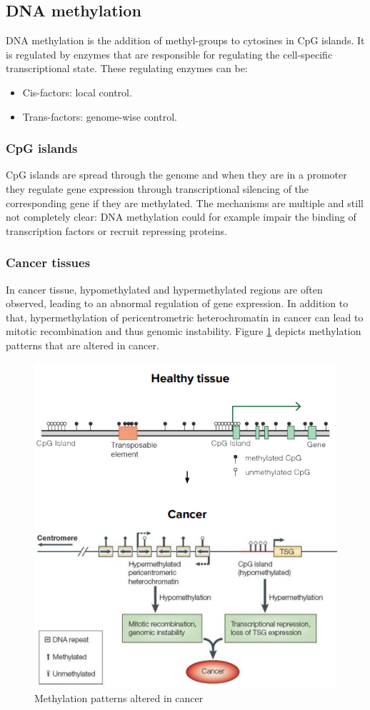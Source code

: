     \subsection{DNA methylation}
    DNA methylation is the addition of methyl-groups to cytosines in CpG islands.
    It is regulated by enzymes that are responsible for regulating the cell-specific transcriptional state.
    These regulating enzymes can be:

    \begin{multicols}{2}
        \begin{itemize}
            \item Cis-factors: local control.
            \item Trans-factors: genome-wise control.
        \end{itemize}
    \end{multicols}



        \subsubsection{CpG islands}
        CpG islands are spread through the genome and when they are in a promoter they regulate gene expression through transcriptional silencing of the corresponding gene if they are methylated.
        The mechanisms are multiple and still not completely clear: DNA methylation could for example impair the binding of transcription factors or recruit repressing proteins.

        \subsubsection{Cancer tissues}
        In cancer tissue, hypomethylated and hypermethylated regions are often observed, leading to an abnormal regulation of gene expression.
        In addition to that, hypermethylation of pericentrometric heterochromatin in cancer can lead to mitotic recombination and thus genomic instability.
        Figure \ref{fig:met-cancer} depicts methylation patterns that are altered in cancer.

        \begin{figure}[H]
        \centering
            \includegraphics[width=0.5\linewidth]{cancerMet.png}
            \caption{Methylation patterns altered in cancer}
            \label{fig:met-cancer}
        \end{figure}


